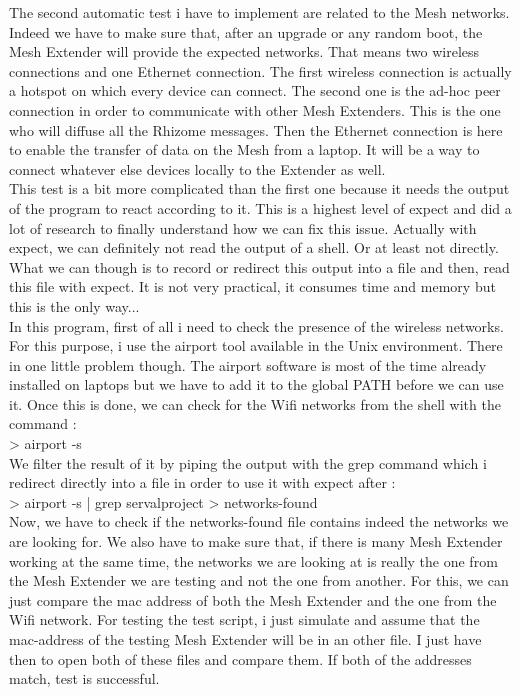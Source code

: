 The second automatic test i have to implement are related to the Mesh networks. Indeed we have to make sure that, after an upgrade or any random boot, the Mesh Extender will provide the expected networks. That means two wireless connections and one Ethernet connection. The first wireless connection is actually a hotspot on which every device can connect. The second one is the ad-hoc peer connection in order to communicate with other Mesh Extenders. This is the one who will diffuse all the Rhizome messages. Then the Ethernet connection is here to enable the transfer of data on the Mesh from a laptop. It will be a way to connect whatever else devices locally to the Extender as well. \\
This test is a bit more complicated than the first one because it needs the output of the program to react according to it. This is a highest level of expect and did a lot of research to finally understand how we can fix this issue. Actually with expect, we can definitely not read the output of a shell. Or at least not directly. What we can though is to record or redirect this output into a file and then, read this file with expect. It is not very practical, it consumes time and memory but this is the only way... \\
In this program, first of all i need to check the presence of the wireless networks. For this purpose, i use the airport tool available in the Unix environment. There in one little problem though. The airport software is most of the time already installed on laptops but we have to add it to the global PATH before we can use it. Once this is done, we can check for the Wifi networks from the shell with the command : \\
> airport -s \\
We filter the result of it by piping the output with the grep command which i redirect directly into a file in order to use it with expect after : \\
> airport -s | grep servalproject > networks-found  \\
Now, we have to check if the networks-found file contains indeed the networks we are looking for. We also have to make sure that, if there is many Mesh Extender working at the same time, the networks we are looking at is really the one from the Mesh Extender we are testing and not the one from another. For this, we can just compare the mac address of both the Mesh Extender and the one from the Wifi network. For testing the test script, i just simulate and assume that the mac-address of the testing Mesh Extender will be in an other file. I just have then to open both of these files and compare them. If both of the addresses match, test is successful. 